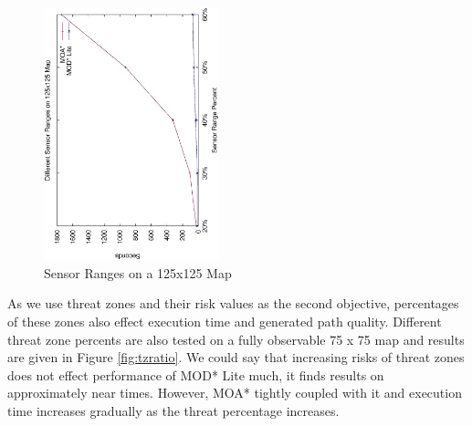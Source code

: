 \documentclass[10pt, a4paper, conference, compsocconf]{IEEEtran}
\begin{document}
\begin{figure}
\centering
\includegraphics[width=2.0in, angle=270]{125x125SensorRange}
\caption{Sensor Ranges on a 125x125 Map}
\label{fig:sensorRanges3}
\end{figure}


As we use threat zones and their risk values as the second objective, percentages of these zones also effect execution time and generated path quality. Different threat zone percents are also tested on a fully observable 75 x 75 map and results are given in Figure \ref{fig:tzratio}. We could say that increasing risks of threat zones  does not effect performance of  MOD* Lite much, it finds results on approximately near times. However, MOA* tightly coupled with it and execution time increases gradually as the threat percentage increases.



\end{document}
